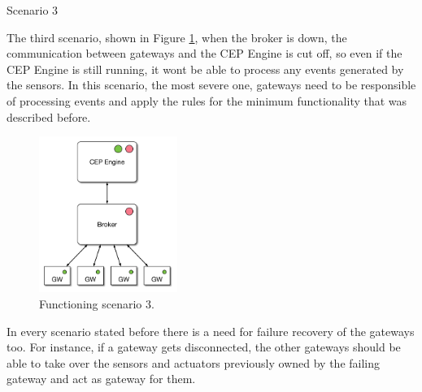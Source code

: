 \begin{Paragraph}{Scenario 3}
	
	The third scenario, shown in Figure \ref{fig:sc3}, when the broker is down, the communication between gateways and the CEP Engine is cut off, so even if the CEP Engine is still running, it wont be able to process any events generated by the sensors.
	In this scenario, the most severe one, gateways need to be responsible of processing events and apply the rules for the minimum functionality that was described before.
	
	\begin{figure}[H]
		\centering
		\includegraphics[width=0.4\textwidth]{figures/sc3.png}
		\caption{Functioning scenario 3. }
		\label{fig:sc3}
	\end{figure}
	
	
\end{Paragraph}

In every scenario stated before there is a need for failure recovery of the gateways too. For instance, if a gateway gets disconnected, the other gateways should be able to take over the sensors and actuators previously owned by the failing gateway and act as gateway for them.












